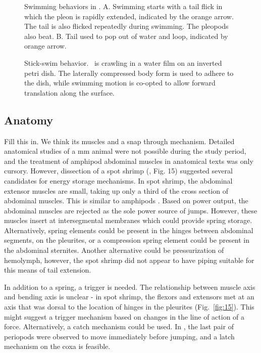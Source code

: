 \documentclass{jeb}
\newcommand{\Hyale}{\Genus{H.~pugettensis}}
\begin{document}
\begin{figure}
\caption{Swimming behaviors in \Hyale.  A.  Swimming starts with a tail flick in which the pleon is rapidly extended, indicated by the orange arrow.  The tail is also flicked repeatedly during swimming.  The pleopods also beat.  B.  Tail used to pop out of water and loop, indicated by orange arrow.}
\label{fig:19}
\end{figure}

\begin{figure}
\caption{Stick-swim behavior.  \Hyale\ is crawling in a water film on an inverted petri dish.  The laterally compressed body form is used to adhere to the dish, while swimming motion is co-opted to allow forward translation along the surface. }
\label{fig:20}
\end{figure}


\subsection{Anatomy}
Fill this in.  We think its muscles and a snap through mechanism. Detailed anatomical studies of a \unit[5]{mm} animal were not possible during the study period, and the treatment of amphipod abdominal muscles in anatomical texts \citep{Schmitz:1991} was only cursory.  However, dissection of a spot shrimp (, Fig. 15) suggested several candidates for energy storage mechanisms.  In spot shrimp, the abdominal extensor muscles are small, taking up only a third of the cross section of abdominal muscles.  This is similar to amphipods \citep{Schmitz:1991}.  Based on power output, the abdominal muscles are rejected as the sole power source of jumps.  However, these muscles insert at intersegmental membranes which could provide spring storage.  Alternatively, spring elements could be present in the hinges between abdominal segments, on the pleurites, or a compression spring element could be present in the abdominal sternites.  Another alternative could be pressurization of hemolymph, however, the spot shrimp did not appear to have piping suitable for this means of tail extension. 
	
In addition to a spring, a trigger is needed.  The relationship between muscle axis and bending axis is unclear - in spot shrimp, the flexors and extensors met at an axis that was dorsal to the location of hinges in the pleurites (Fig.~\ref{fig:15}).  This might suggest a trigger mechanism based on changes in the line of action of a force.  Alternatively, a catch mechanism could be used.  In \Hyale, the last pair of periopods were observed to move immediately before jumping, and a latch mechanism on the coxa is feasible.    
	
\end{document}
